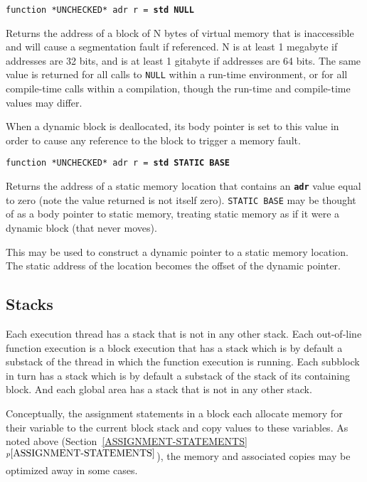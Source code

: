 \documentclass[12pt]{article}
\makeatletter
\newcommand{\TT}[1]{{\tt \bfseries #1}}
\newcommand{\ttstdkey}[1]{\TT{std #1}\index{#1@{\tt std #1}}}
\newcommand{\itemref}[1]{\ref{#1}$^{p\pageref{#1}}$}
\newenvironment{indpar}[1][0.3in]%
	{\begin{list}{}%
		     {\setlength{\itemsep}{0in}%
		      \setlength{\topsep}{0in}%
		      \setlength{\parsep}{1ex}%
		      \setlength{\labelwidth}{#1}%
		      \setlength{\leftmargin}{#1}%
		      \addtolength{\leftmargin}{\labelsep}}%
	 \item}%
	{\end{list}}
\makeatother
\begin{document}
\begin{indpar}

{\tt function *UNCHECKED* adr r = \ttstdkey{NULL}}\label{NULL}

\begin{indpar}
Returns the address of a block of N bytes of virtual memory that is
inaccessible and will cause a segmentation fault if referenced.
N is at least 1 megabyte if addresses are 32 bits, and is at least
1 gitabyte if addresses are 64 bits.  The same value is returned for
all calls to {\tt NULL} within a run-time environment, or for all compile-time
calls within a compilation,  though the run-time and compile-time values
may differ.

When a dynamic block is deallocated, its body pointer is set to
this value in order to cause any reference to the block to trigger
a memory fault.
\end{indpar}

{\tt function *UNCHECKED* adr r = \ttstdkey{STATIC BASE}}\label{STATIC BASE}

\begin{indpar}
Returns the address of a static memory location that contains an
\TT{adr} value equal to zero (note the value returned is not itself zero).
{\tt STATIC BASE} may be thought of as a body pointer to static memory,
treating static memory as if it were a dynamic block (that never moves).

This may be used to construct a dynamic pointer to a static
memory location.  The static address of the location becomes the
offset of the dynamic pointer.
\end{indpar}

\end{indpar}

\subsection{Stacks}
\label{STACKS}

Each execution thread has a stack that is not in any other
stack.  Each out-of-line function
execution is a block execution that has a stack which is
by default a substack of the thread in which the function
execution is running.  Each subblock in turn has a stack
which is by default a substack of the stack of its containing block.
And each global area has a stack that is not in any other stack.

Conceptually, the assignment statements in a block each allocate memory for
their variable to the current block stack and copy values to these
variables.  As noted above (Section~\itemref{ASSIGNMENT-STATEMENTS}),
the memory and associated copies may be
optimized away in some cases.
\end{document}
